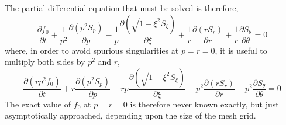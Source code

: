 The partial differential equation that must be solved is therefore,
\[
\frac{\partial f_{0}}{\partial t}+\frac{1}{p^{2}}\frac{\partial\left(p^{2}S_{p}\right)}{\partial p}-\frac{1}{p}\frac{\partial\left(\sqrt{1-\xi^{2}}S_{\xi}\right)}{\partial\xi}+\frac{1}{r}\frac{\partial\left(rS_{r}\right)}{\partial r}+\frac{1}{r}\frac{\partial S_{\theta}}{\partial\theta}=0\]
 where, in order to avoid spurious singularities at $p=r=0$, it is
useful to multiply both sides by $p^{2}$ and $r$,\[
\frac{\partial\left(rp^{2}f_{0}\right)}{\partial t}+r\frac{\partial\left(p^{2}S_{p}\right)}{\partial p}-rp\frac{\partial\left(\sqrt{1-\xi^{2}}S_{\xi}\right)}{\partial\xi}+p^{2}\frac{\partial\left(rS_{r}\right)}{\partial r}+p^{2}\frac{\partial S_{\theta}}{\partial\theta}=0\]
 The exact value of $f_{0}$ at $p=r=0$ is therefore never known
exactly, but just asymptotically approached, depending upon the size
of the mesh grid.


